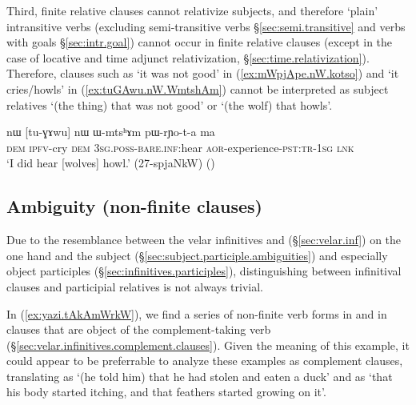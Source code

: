 Third, finite relative clauses cannot relativize subjects, and therefore `plain' intransitive verbs (excluding semi-transitive verbs §\ref{sec:semi.transitive} and verbs with goals §\ref{sec:intr.goal}) cannot occur in finite relative clauses (except in the case of locative and time adjunct relativization, §\ref{sec:time.relativization}). Therefore, clauses such as  `it was not good' in (\ref{ex:mWpjApe.nW.kotso}) and  `it cries/howls' in (\ref{ex:tuGAwu.nW.WmtshAm}) cannot be interpreted as subject relatives `(the thing) that was not good' or `(the wolf) that howls'.

\begin{exe}
\ex \label{ex:tuGAwu.nW.WmtshAm}
\gll nɯ [tu-ɣɤwu] nɯ ɯ-mtsʰɤm pɯ-rɲo-t-a ma  \\
\textsc{dem} \textsc{ipfv}-cry \textsc{dem} \textsc{3sg}.\textsc{poss}-\textsc{bare}.\textsc{inf}:hear \textsc{aor}-experience-\textsc{pst}:\textsc{tr}-\textsc{1sg} \textsc{lnk} \\
\glt `I did hear [wolves] howl.' (27-spjaNkW)
()
\end{exe}

\subsection{Ambiguity (non-finite clauses)} \label{sec:non-finite.relative.complement.ambiguity}
Due to the resemblance between the velar infinitives  and  (§\ref{sec:velar.inf}) on the one hand and the subject (§\ref{sec:subject.participle.ambiguities}) and especially object participles (§\ref{sec:infinitives.participles}), distinguishing between infinitival clauses and participial relatives is not always trivial.

In (\ref{ex:yazi.tAkAmWrkW}), we find a series of non-finite verb forms in  and  in clauses that are object of the complement-taking verb  (§\ref{sec:velar.infinitives.complement.clauses}). Given the meaning of this example, it could appear to be preferrable to analyze these examples as complement clauses, translating  as `(he told him) that he had stolen and eaten a duck' and  as `that his body started itching, and that feathers started growing on it'. 

